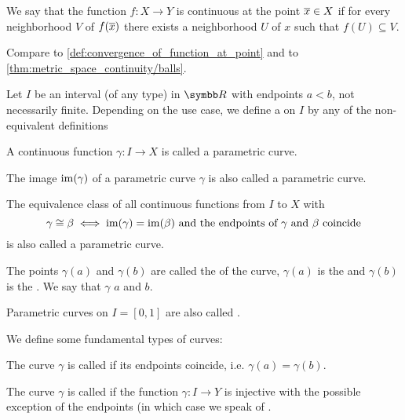 \begin{definition}\label{def:continuous_function_at_point}
  We say that the function \( f: X \to Y \) is continuous at the point \( \overline{x} \in X \) if for every neighborhood \( V \) of \( f(\overline{x}) \) there exists a neighborhood \( U \) of \( x \) such that \( f(U) \subseteq V \).

  Compare to \cref{def:convergence_of_function_at_point} and to \cref{thm:metric_space_continuity/balls}.
\end{definition}

\begin{definition}\label{def:parametric_curve}
   Let \( I \) be an interval (of any type) in \( \BR \) with endpoints \( a < b \), not necessarily finite. Depending on the use case, we define a  on \( I \) by any of the non-equivalent definitions

  \begin{defenum}
     A continuous function \( \gamma: I \to X \) is called a parametric curve.

     The image \( \operatorname{im}(\gamma) \) of a parametric curve \( \gamma \) is also called a parametric curve.

     The equivalence class of all continuous functions from \( I \) to \( X \) with
    \begin{equation*}
      \gamma \cong \beta \iff \operatorname{im}(\gamma) = \operatorname{im}(\beta) \text{ and the endpoints of } \gamma \text{ and } \beta \text{ coincide}
    \end{equation*}
    is also called a parametric curve.
  \end{defenum}

  The points \( \gamma(a) \) and \( \gamma(b) \) are called the  of the curve, \( \gamma(a) \) is the  and \( \gamma(b) \) is the . We say that \( \gamma \)  \( a \) and \( b \).

  Parametric curves on \( I = [0, 1] \) are also called .

  We define some fundamental types of curves:
  \begin{defenum}
     The curve \( \gamma \) is called  if its endpoints coincide, i.e. \( \gamma(a) = \gamma(b) \).

     The curve \( \gamma \) is called  if the function \( \gamma: I \to Y \) is injective with the possible exception of the endpoints (in which case we speak of .
  \end{defenum}


\end{definition}
